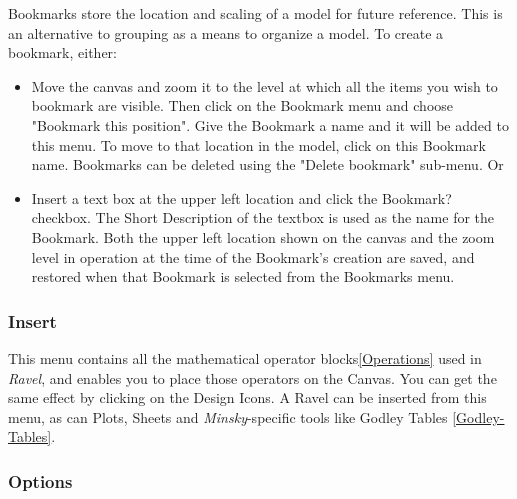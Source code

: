 \label{Bookmarks} Bookmarks store the location and scaling of a model
for future reference. This is an alternative to grouping as a means
to organize a model. To create a bookmark, either:
\begin{itemize}
\item Move the canvas and zoom it to the level at which all the items you
wish to bookmark are visible. Then click on the Bookmark menu and
choose "Bookmark this position". Give the Bookmark a name and it
will be added to this menu. To move to that location in the model,
click on this Bookmark name. Bookmarks can be deleted using the "Delete
bookmark" sub-menu. Or
\item Insert a text box at the upper left location and click the Bookmark?
checkbox. The Short Description of the textbox is used as the name
for the Bookmark. Both the upper left location shown on the canvas
and the zoom level in operation at the time of the Bookmark's creation
are saved, and restored when that Bookmark is selected from the Bookmarks
menu.
\end{itemize}

\subsubsection{Insert}

\label{Insert}

This menu contains all the mathematical operator blocks\ref{Operations}
used in \emph{Ravel}, and enables you to place those operators on
the Canvas. You can get the same effect by clicking on the Design
Icons. A Ravel can be inserted from this menu, as can Plots, Sheets
and \emph{Minsky}-specific tools like Godley Tables \ref{Godley-Tables}.

\subsubsection{Options}

\label{Options}

